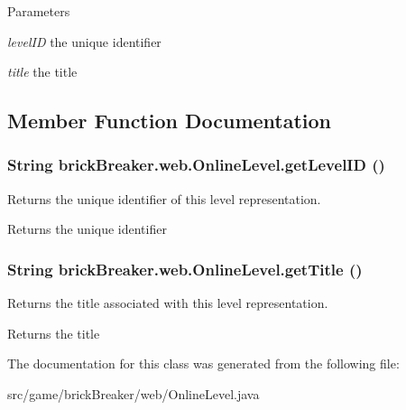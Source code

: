 \begin{DoxyParams}{Parameters}
\item[{\em levelID}]the unique identifier \item[{\em title}]the title \end{DoxyParams}


\subsection{Member Function Documentation}
\hypertarget{classbrick_breaker_1_1web_1_1_online_level_a265cd345985cde1aa244cb739445bbc3}{
\subsubsection[{getLevelID}]{\setlength{\rightskip}{0pt plus 5cm}String brickBreaker.web.OnlineLevel.getLevelID ()}}
\label{classbrick_breaker_1_1web_1_1_online_level_a265cd345985cde1aa244cb739445bbc3}
Returns the unique identifier of this level representation.

\begin{DoxyReturn}{Returns}
the unique identifier 
\end{DoxyReturn}
\hypertarget{classbrick_breaker_1_1web_1_1_online_level_a0a23b746281c6b60e88dab532ab77df4}{
\subsubsection[{getTitle}]{\setlength{\rightskip}{0pt plus 5cm}String brickBreaker.web.OnlineLevel.getTitle ()}}
\label{classbrick_breaker_1_1web_1_1_online_level_a0a23b746281c6b60e88dab532ab77df4}
Returns the title associated with this level representation.

\begin{DoxyReturn}{Returns}
the title 
\end{DoxyReturn}


The documentation for this class was generated from the following file:\begin{DoxyCompactItemize}
\item 
src/game/brickBreaker/web/OnlineLevel.java\end{DoxyCompactItemize}
